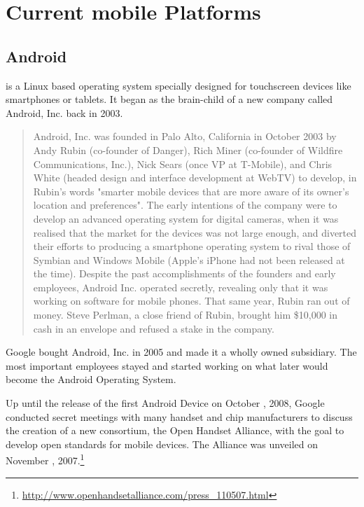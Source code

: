 \chapter{Current mobile Platforms}\label{ch:m_plats} %
\section{Android}
 is a Linux based operating system specially designed for touchscreen devices like smartphones or tablets. It began as the brain-child of a new company called Android, Inc. back in 2003.

\begin{quotation}
Android, Inc. was founded in Palo Alto, California in October 2003 by Andy Rubin (co-founder of Danger), Rich Miner (co-founder of Wildfire Communications, Inc.), Nick Sears (once VP at T-Mobile), and Chris White (headed design and interface development at WebTV) to develop, in Rubin's words "smarter mobile devices that are more aware of its owner's location and preferences". The early intentions of the company were to develop an advanced operating system for digital cameras, when it was realised that the market for the devices was not large enough, and diverted their efforts to producing a smartphone operating system to rival those of Symbian and Windows Mobile (Apple's iPhone had not been released at the time). Despite the past accomplishments of the founders and early employees, Android Inc. operated secretly, revealing only that it was working on software for mobile phones. That same year, Rubin ran out of money. Steve Perlman, a close friend of Rubin, brought him \$10,000 in cash in an envelope and refused a stake in the company.
\cite{wikipedia:android}
\end{quotation}

Google bought Android, Inc. in 2005 and made it a wholly owned subsidiary. The most important employees stayed and started working on what later would become the Android Operating System.

Up until the release of the first Android Device on October , 2008, Google conducted secret meetings with many handset and chip manufacturers to discuss the creation of a new consortium, the Open Handset Alliance, with the goal to develop open standards for mobile devices. The Alliance was unveiled on November , 2007.\footnote{\url{http://www.openhandsetalliance.com/press_110507.html}}



